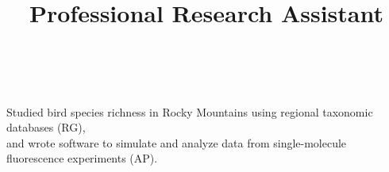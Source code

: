 \documentclass[overlapped,line]{res}
\begin{document}
\begin{resume}
\title{Professional Research Assistant}
\begin{position} \\[-4mm] 
\\ Studied bird species richness in Rocky Mountains using regional taxonomic databases (RG), \\
and wrote software to simulate and analyze data from single-molecule fluorescence experiments (AP).
\end{position}






\end{resume}
\end{document}
